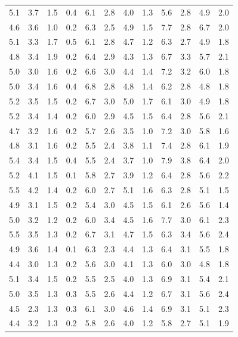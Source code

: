 \begin{mvtable}
{\begin{tabular}{cccccccccccc}
5.1 & 3.7 & 1.5 & 0.4 & 6.1 & 2.8 & 4.0 & 1.3 & 5.6 & 2.8 & 4.9 & 2.0\\
4.6 & 3.6 & 1.0 & 0.2 & 6.3 & 2.5 & 4.9 & 1.5 & 7.7 & 2.8 & 6.7 & 2.0\\
5.1 & 3.3 & 1.7 & 0.5 & 6.1 & 2.8 & 4.7 & 1.2 & 6.3 & 2.7 & 4.9 & 1.8\\
4.8 & 3.4 & 1.9 & 0.2 & 6.4 & 2.9 & 4.3 & 1.3 & 6.7 & 3.3 & 5.7 & 2.1\\
5.0 & 3.0 & 1.6 & 0.2 & 6.6 & 3.0 & 4.4 & 1.4 & 7.2 & 3.2 & 6.0 & 1.8\\
5.0 & 3.4 & 1.6 & 0.4 & 6.8 & 2.8 & 4.8 & 1.4 & 6.2 & 2.8 & 4.8 & 1.8\\
5.2 & 3.5 & 1.5 & 0.2 & 6.7 & 3.0 & 5.0 & 1.7 & 6.1 & 3.0 & 4.9 & 1.8\\
5.2 & 3.4 & 1.4 & 0.2 & 6.0 & 2.9 & 4.5 & 1.5 & 6.4 & 2.8 & 5.6 & 2.1\\
4.7 & 3.2 & 1.6 & 0.2 & 5.7 & 2.6 & 3.5 & 1.0 & 7.2 & 3.0 & 5.8 & 1.6\\
4.8 & 3.1 & 1.6 & 0.2 & 5.5 & 2.4 & 3.8 & 1.1 & 7.4 & 2.8 & 6.1 & 1.9\\
5.4 & 3.4 & 1.5 & 0.4 & 5.5 & 2.4 & 3.7 & 1.0 & 7.9 & 3.8 & 6.4 & 2.0\\
5.2 & 4.1 & 1.5 & 0.1 & 5.8 & 2.7 & 3.9 & 1.2 & 6.4 & 2.8 & 5.6 & 2.2\\
5.5 & 4.2 & 1.4 & 0.2 & 6.0 & 2.7 & 5.1 & 1.6 & 6.3 & 2.8 & 5.1 & 1.5\\
4.9 & 3.1 & 1.5 & 0.2 & 5.4 & 3.0 & 4.5 & 1.5 & 6.1 & 2.6 & 5.6 & 1.4\\
5.0 & 3.2 & 1.2 & 0.2 & 6.0 & 3.4 & 4.5 & 1.6 & 7.7 & 3.0 & 6.1 & 2.3\\
5.5 & 3.5 & 1.3 & 0.2 & 6.7 & 3.1 & 4.7 & 1.5 & 6.3 & 3.4 & 5.6 & 2.4\\
4.9 & 3.6 & 1.4 & 0.1 & 6.3 & 2.3 & 4.4 & 1.3 & 6.4 & 3.1 & 5.5 & 1.8\\
4.4 & 3.0 & 1.3 & 0.2 & 5.6 & 3.0 & 4.1 & 1.3 & 6.0 & 3.0 & 4.8 & 1.8\\
5.1 & 3.4 & 1.5 & 0.2 & 5.5 & 2.5 & 4.0 & 1.3 & 6.9 & 3.1 & 5.4 & 2.1\\
5.0 & 3.5 & 1.3 & 0.3 & 5.5 & 2.6 & 4.4 & 1.2 & 6.7 & 3.1 & 5.6 & 2.4\\
4.5 & 2.3 & 1.3 & 0.3 & 6.1 & 3.0 & 4.6 & 1.4 & 6.9 & 3.1 & 5.1 & 2.3\\
4.4 & 3.2 & 1.3 & 0.2 & 5.8 & 2.6 & 4.0 & 1.2 & 5.8 & 2.7 & 5.1 & 1.9\\
\bottomrule
\end{tabular}
}
\end{mvtable}
